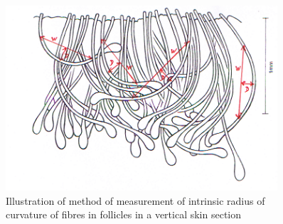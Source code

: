 %

\begin{figure}[!h]
  \centering
   \includegraphics[width=0.9\textwidth]{curvmeas.png}
  \caption{Illustration of method of measurement of intrinsic radius of curvature of fibres in follicles in a vertical skin section}
  \label{curvmeas}
\end{figure}

%

